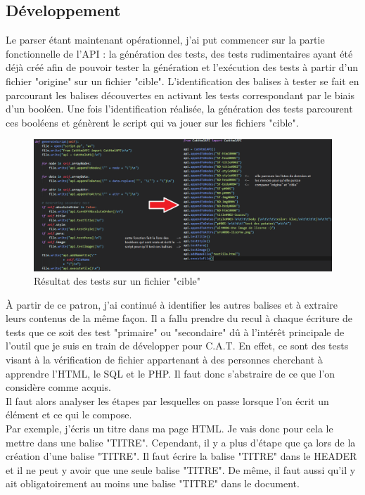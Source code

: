 \subsection{Développement}

Le parser étant maintenant opérationnel, j'ai put commencer sur la partie fonctionnelle de l'API : la génération des tests, des tests rudimentaires ayant été déjà créé afin de pouvoir tester la génération et l'exécution des tests à partir d'un fichier "origine" sur un fichier "cible". L'identification des balises à tester se fait en parcourant les balises découvertes en activant les tests correspondant par le biais d'un booléen. Une fois l'identification réalisée, la génération des tests parcourent ces booléens et génèrent le script qui va jouer sur les fichiers "cible".\\

\begin{figure}[ht]
\centering
\includegraphics[width=1\textwidth]{scripts-envoye.png}
\caption{\label{fig:scriptenv}Résultat des tests sur un fichier "cible"}
\end{figure}

À partir de ce patron, j'ai continué à identifier les autres balises et à extraire leurs contenus de la même façon. Il a fallu prendre du recul à chaque écriture de tests que ce soit des test "primaire" ou "secondaire" dû à l'intérêt principale de l'outil que je suis en train de développer pour C.A.T. En effet, ce sont des tests visant à la vérification de fichier appartenant à des personnes cherchant à apprendre l'HTML, le SQL et le PHP. Il faut donc s'abstraire de ce que l'on considère comme acquis.\\

Il faut alors analyser les étapes par lesquelles on passe lorsque l'on écrit un élément et ce qui le compose.\\

Par exemple, j'écris un titre dans ma page HTML. Je vais donc pour cela le mettre dans une balise "TITRE". Cependant, il y a plus d'étape que ça lors de la création d'une balise "TITRE". Il faut écrire la balise "TITRE" dans le HEADER et il ne peut y avoir que une seule balise "TITRE". De même, il faut aussi qu'il y ait obligatoirement au moins une balise "TITRE" dans le document.\\

